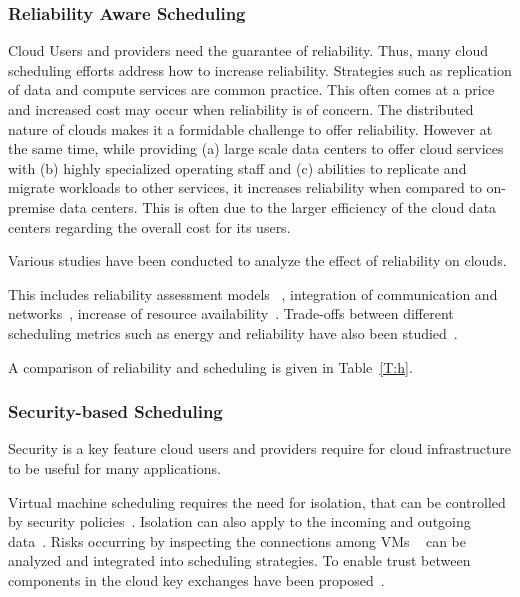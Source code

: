 \documentclass[final,5p,times,twocolumn]{elsarticle}
\begin{document}
%

\subsubsection{Reliability Aware Scheduling}\label{sec:reliability}



Cloud Users and providers need the guarantee of reliability. Thus, many cloud scheduling efforts address how to increase reliability. Strategies such as replication of data and compute services are common practice. This often comes at a price and increased cost may occur when reliability is of concern. The distributed nature of clouds makes it a formidable challenge to offer reliability. However at the same time, while providing (a) large scale data centers to offer cloud services with (b) highly specialized operating staff and (c) abilities to replicate and migrate workloads to other services, it increases reliability when compared to on-premise data centers. This is often due to the larger efficiency of the cloud data centers regarding the overall cost for its users.

Various studies have been conducted to analyze the effect of reliability on clouds.

This includes reliability assessment models ~\cite{malik2012reliability}, integration of communication and networks~\cite{jing2015reliability}, increase of resource availability~\cite{latiff2016fault}. Trade-offs between different scheduling metrics such as energy and reliability have also been studied~\cite{tang2016energy}.

A comparison of reliability and scheduling is given in Table~\ref{T:h}.

%

\subsubsection{Security-based Scheduling}\label{sec:security}


Security is a key feature cloud users and providers require for cloud infrastructure to be useful for many applications.

Virtual machine scheduling requires the need for isolation, that can be controlled by security policies~\cite{afoulki2011security}. Isolation can also apply to the incoming and outgoing data~\cite{chejerla2017qos,kashyap2014security}. Risks occurring by inspecting the connections among VMs ~\cite{shetty2016security} can be analyzed and integrated into scheduling strategies. To enable trust between components in the cloud key exchanges have been proposed~\cite{liu2013ccbke}.
\end{document}

